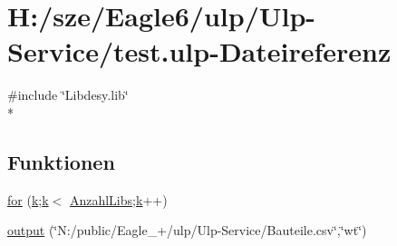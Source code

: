 \hypertarget{test_8ulp}{}\section{H\+:/sze/\+Eagle6/ulp/\+Ulp-\/\+Service/test.ulp-\/\+Dateireferenz}
\label{test_8ulp}
{\ttfamily \#include \char`\"{}Libdesy.\+lib\char`\"{}}\\*
\subsection*{Funktionen}
\begin{DoxyCompactItemize}
\item 
\hyperlink{test_8ulp_a7ff0a764a1a161522eb0e1c3b7981d20}{for} (\hyperlink{test_8ulp_ab66ed8e0098c0a86b458672a55a9cca9}{k};\hyperlink{test_8ulp_ab66ed8e0098c0a86b458672a55a9cca9}{k}$<$ \hyperlink{test_8ulp_ae8b208e90c3b4ab20d7c823612b1a0f7}{Anzahl\+Libs};\hyperlink{test_8ulp_ab66ed8e0098c0a86b458672a55a9cca9}{k}++)
\item 
\hyperlink{test_8ulp_a6db4303775314f3afbb16074b373f079}{output} (\char`\"{}N\+:/public/Eagle\+\_+/ulp/Ulp-\/Service/Bauteile.\+csv\char`\"{},\char`\"{}wt\char`\"{})
\end{DoxyCompactItemize}
